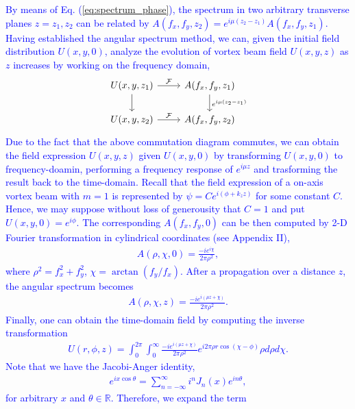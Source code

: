 \textcolor{blue}{
By means of Eq. (\ref{eq:spectrum_phase}), the spectrum in two arbitrary transverse planes $z = z_1, z_2$ can be related by $A(f_x, f_y, z_2) = e^{i \mu (z_2 - z_1)} A(f_x, f_y, z_1)$. Having established the angular spectrum method, we can, given the initial field distribution $U(x, y, 0)$, analyze the evolution of vortex beam field $U(x, y, z)$ as $z$ increases by working on the frequency domain,
}
\begin{eqnarray}
\begin{tikzcd}
	U(x, y, z_1) \arrow[r, "{\cal F}"] \arrow[d] 
		& A(f_x, f_y, z_1) \arrow[d, "e^{i\mu(z_2 - z_1)}"]\\
	U(x, y, z_2) \arrow[r, "{\cal F}"]
		& A(f_x, f_y, z_2)
\end{tikzcd}
\end{eqnarray}
\textcolor{blue}{
Due to the fact that the above commutation diagram commutes, we can obtain the field expression $U(x, y, z)$ given $U(x, y, 0)$ by transforming $U(x, y, 0)$ to frequency-doamin, performing a frequency response of $e^{i \mu z}$ and trasforming the result back to the time-domain. Recall that the field expression of a on-axis vortex beam with $m = 1$ is represented by $\psi = Ce^{i (\phi + k_z z)}$ for some constant $C$. Hence, we may suppose without loss of generousity that $C = 1$ and put $U(x, y, 0) = e^{i\phi}$. The corresponding $A(f_x, f_y, 0)$ can be then computed by 2-D Fourier transformation in cylindrical coordinates (see Appendix II),
\begin{eqnarray}
	A(\rho, \chi, 0) = \frac{-i e^{i\chi}}{2\pi \rho^2},
\end{eqnarray}
where $\rho^2 = f_x^2 + f_y^2$, $ \chi = \arctan(f_y/f_x)$. After a propagation over a distance $z$, the angular spectrum becomes
\begin{eqnarray}
	A(\rho, \chi, z) = \frac{-i e^{i(\mu z + \chi)}}{2\pi \rho^2}.
\end{eqnarray}
Finally, one can obtain the time-domain field by computing the inverse transformation
\begin{eqnarray}
	U(r, \phi, z) =  \int_{0}^{2\pi} \int_{0}^{\infty} \frac{-i e^{i(\mu z + \chi)}}{2\pi \rho^2}e^{i 2\pi \rho r \cos(\chi - \phi)} \rho d\rho d\chi.
	\nonumber
\end{eqnarray}
Note that we have the Jacobi-Anger identity,
\begin{eqnarray}
	e^{ix\cos\theta} = \sum_{n = -\infty}^{\infty} i^n J_{n}(x) e^{i n \theta},
\end{eqnarray}
for arbitrary $x$ and  $\theta \in \mathbb{R}$. Therefore, we expand the term
}
